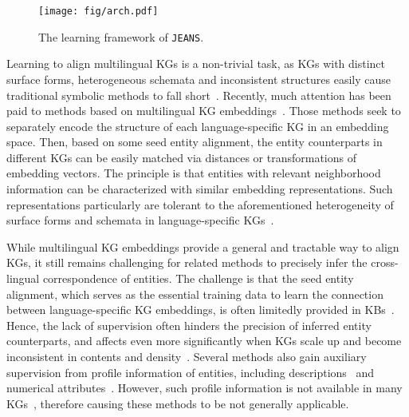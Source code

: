\documentclass[11pt,a4paper]{article}
\newcommand{\modelname}[0]{\texttt{JEANS}\xspace}
\begin{document}
\begin{figure}[!t]
	\centering
	\texttt{[image: fig/arch.pdf]}
\caption{The learning framework of \modelname.}
\label{fig:arch}
\end{figure}


Learning to align multilingual KGs is a non-trivial task,
as KGs with distinct surface forms, heterogeneous schemata and inconsistent structures easily cause traditional symbolic methods to fall short~\cite{suchanek2011paris,wijaya2013pidgin,jimenez2012large}.
Recently, much attention has been paid to methods based on multilingual KG embeddings~\cite{chen2017multigraph,chen2017akbc,chen2018co,sun2017cross,sun2018bootstrapping,sun2019transedge,zhang2019multi}.
Those methods seek to separately encode the structure of each language-specific KG in an embedding space.
Then, based on some seed entity alignment, the entity counterparts in different KGs can be easily matched via distances or transformations of embedding vectors.
The principle is that entities with relevant neighborhood information can be characterized with similar embedding representations. Such representations particularly are tolerant to the aforementioned heterogeneity of surface forms and schemata in language-specific KGs~\cite{chen2017multigraph,sun2018bootstrapping,sun2020alinet}.




While multilingual KG embeddings provide a general and tractable way to align KGs,
it still remains challenging for related methods to precisely infer the cross-lingual correspondence of entities.
The challenge is that the seed entity alignment, which serves as the essential training data to learn the connection between language-specific KG embeddings, is often limitedly provided in KBs~\cite{chen2018co,sun2018bootstrapping}.
Hence, the lack of supervision often hinders the precision of inferred entity counterparts, and affects even more significantly when KGs scale up and become inconsistent in contents and density~\cite{pujara2017sparsity}.
Several methods also gain auxiliary supervision from profile information of entities, including descriptions~\cite{chen2018co,yang2019aligning,zhang2019multi} and numerical attributes~\cite{sun2017cross,distiawanTrsedya2019}.
However, such profile information is not available in many KGs~\cite{speer2017conceptnet,mitchell2018never,bond2013linking}, therefore causing these methods to be not generally applicable.
\end{document}
